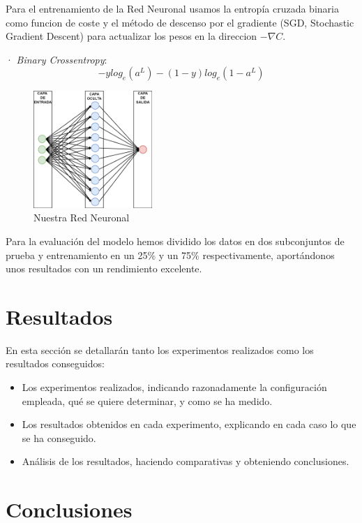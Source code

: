 \documentclass[conference,a4paper]{IEEEtran}
\begin{document}
Para el entrenamiento de la Red Neuronal usamos la entropía cruzada binaria como funcion de coste  y el método de descenso por el gradiente (SGD, Stochastic Gradient Descent) para actualizar los pesos en la direccion $-\nabla C$.

· \emph{Binary Crossentropy}:
\begin{equation}
 -y log_e(a^L) - (1-y) log_e(1 - a^L)
\end{equation}

\begin{figure}
    \centering
    \includegraphics[width=0.4\textwidth]{./ImagenesMemoria/RedNeuronal}
    \caption{\label{fig:red}Nuestra Red Neuronal}
\end{figure}

Para la evaluación del modelo hemos dividido los datos en dos subconjuntos de prueba y entrenamiento en un 25\% y un 75\% respectivamente, aportándonos unos resultados con un rendimiento excelente.


\section{Resultados}

En esta sección se detallarán tanto los experimentos realizados como los
resultados conseguidos:
\begin{itemize}
\item Los experimentos realizados, indicando razonadamente la configuración
  empleada, qué se quiere determinar, y como se ha medido.
\item Los resultados obtenidos en cada experimento, explicando en cada caso lo
  que se ha conseguido.
\item Análisis de los resultados, haciendo comparativas y obteniendo
  conclusiones.
\end{itemize}





\section{Conclusiones}
\end{document}
